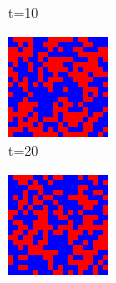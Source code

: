 \documentclass[a4paper, 11pt]{article}
\begin{document}
\begin{figure}[H]
\begin{subfigure}{.25\textwidth}
  \caption{t=10}
\end{subfigure}
\begin{subfigure}{.25\textwidth}
  \centering
  \includegraphics[width=0.9\linewidth]{SNOWDRIFT_MOORE_20x20_t20}
  \caption{t=20}
\end{subfigure}%
\begin{subfigure}{.25\textwidth}
  \centering
  \includegraphics[width=0.9\linewidth]{SNOWDRIFT_MOORE_20x20_t50}

\end{subfigure}
\end{figure}
\end{document}
